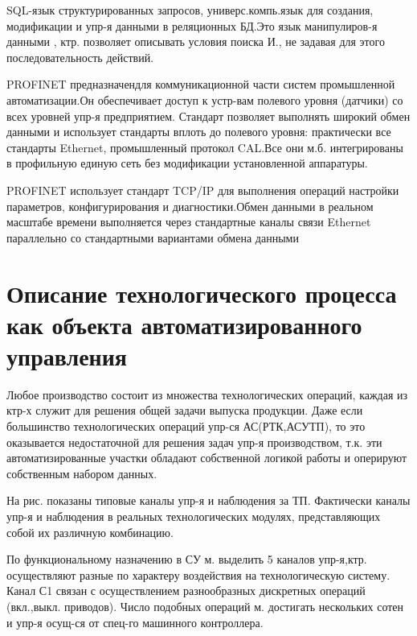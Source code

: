 \documentclass[unicode, 12pt, a4paper, oneside]{article}
\begin{document}
SQL-язык структурированных запросов, универс.компь.язык для создания, модификации и упр-я данными в реляционных БД.Это язык манипулиров-я данными , ктр. позволяет описывать условия поиска И., не задавая для этого последовательность действий.

PROFINET предназначендля коммуникационной части систем промышленной автоматизации.Он обеспечивает доступ к устр-вам полевого уровня (датчики) со всех уровней упр-я предприятием. Стандарт позволяет выполнять широкий обмен данными и использует стандарты вплоть до полевого уровня: практически все стандарты Ethernet, промышленный протокол CAL.Все они м.б. интегрированы в профильную единую сеть без модификации установленной аппаратуры.

PROFINET использует стандарт TCP/IP для выполнения операций настройки параметров, конфигурирования и диагностики.Обмен данными в реальном масштабе времени выполняется через стандартные каналы связи Ethernet параллельно со стандартными вариантами обмена данными

\section{Описание технологического процесса как объекта автоматизированного управления }

Любое производство состоит из множества технологических операций, каждая из ктр-х служит для решения общей задачи выпуска продукции. Даже если большинство технологических операций упр-ся АС(РТК,АСУТП), то это оказывается недостаточной для решения задач упр-я производством, т.к. эти автоматизированные участки обладают собственной логикой работы и оперируют собственным набором данных.


На рис. показаны типовые каналы упр-я и наблюдения за ТП. Фактически каналы упр-я и наблюдения в реальных технологических модулях, представляющих собой их различную комбинацию.

По функциональному назначению в СУ м. выделить 5 каналов упр-я,ктр. осуществляют разные по характеру воздействия на технологическую систему. 
Канал С1 связан с осуществлением разнообразных дискретных операций (вкл.,выкл. приводов). Число подобных операций м. достигать нескольких сотен и упр-я осущ-ся от спец-го машинного контроллера.
\end{document}
